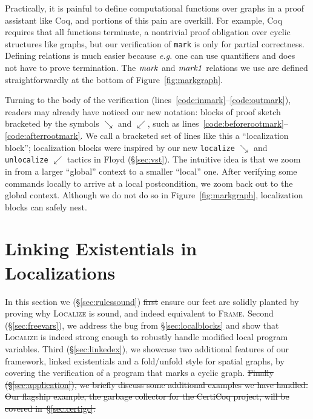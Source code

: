 \documentclass[acmsmall,screen]{acmart}  %
\newcommand{\li}[1]{{\texttt{\small #1}}} %
\providecommand{\DIFadd}[1]{{\protect\color{blue}\uwave{#1}}} %
\providecommand{\DIFdel}[1]{{\protect\color{red}\sout{#1}}}                      %
\providecommand{\DIFaddbegin}{} %
\providecommand{\DIFaddend}{} %
\providecommand{\DIFdelbegin}{} %
\providecommand{\DIFdelend}{} %
\newcommand{\DIFscaledelfig}{0.5}
\newlength{\DIFdelgraphicswidth} %
\newlength{\DIFdelgraphicsheight} %
\newcommand{\DIFaddincludegraphics}[2][]{{\color{blue}\fbox{\DIFOincludegraphics[#1]{#2}}}} %
\newcommand{\DIFdelincludegraphics}[2][]{%
\sbox{\DIFdelgraphicsbox}{\DIFOincludegraphics[#1]{#2}}%
\settoboxwidth{\DIFdelgraphicswidth}{\DIFdelgraphicsbox} %
\settoboxtotalheight{\DIFdelgraphicsheight}{\DIFdelgraphicsbox} %
\scalebox{\DIFscaledelfig}{%
\parbox[b]{\DIFdelgraphicswidth}{\usebox{\DIFdelgraphicsbox}\\[-\baselineskip] \rule{\DIFdelgraphicswidth}{0em}}\llap{\resizebox{\DIFdelgraphicswidth}{\DIFdelgraphicsheight}{%
\setlength{\unitlength}{\DIFdelgraphicswidth}%
\begin{picture}(1,1)%
\thicklines\linethickness{2pt} %
{\color[rgb]{1,0,0}\put(0,0){\framebox(1,1){}}}%
{\color[rgb]{1,0,0}\put(0,0){\line( 1,1){1}}}%
{\color[rgb]{1,0,0}\put(0,1){\line(1,-1){1}}}%
\end{picture}%
}\hspace*{3pt}}} %
} %
\DeclareRobustCommand{\DIFaddbegin}{\DIFOaddbegin \let\includegraphics\DIFaddincludegraphics} %
\DeclareRobustCommand{\DIFaddend}{\DIFOaddend \let\includegraphics\DIFOincludegraphics} %
\DeclareRobustCommand{\DIFdelbegin}{\DIFOdelbegin \let\includegraphics\DIFdelincludegraphics} %
\DeclareRobustCommand{\DIFdelend}{\DIFOaddend \let\includegraphics\DIFOincludegraphics} %
\begin{document}
{Practically, it is painful to define computational functions over graphs in a proof assistant like Coq, and portions of this pain are overkill.  For example, Coq requires that all functions terminate, a nontrivial proof obligation over cyclic structures like graphs, but our verification of \li{mark} is only for partial correctness.  Defining relations is much easier because \emph{e.g.} one can use quantifiers and does not have to prove termination.
The $\mathit{mark}$ and $\mathit{mark1}$ relations we use are defined straightforwardly at the bottom of Figure~\ref{fig:markgraph}.

Turning to the body of the verification (lines~\ref{code:inmark}--\ref{code:outmark}), readers may already have noticed our new notation: blocks of proof sketch bracketed by the symbols $\searrow$ and $\swarrow$, such as lines~\ref{code:beforerootmark}--\ref{code:afterrootmark}.  We call a bracketed set of lines like this a ``localization block''; localization blocks were inspired by our new \li{localize} $\searrow$ and \li{unlocalize} $\swarrow$ tactics in Floyd (\S\ref{sec:vst}).
The intuitive idea is that we zoom in from a larger ``global'' context to a smaller ``local'' one.  After verifying some commands locally to arrive at a local postcondition, we zoom back out to the global context.  Although we do not do so in Figure~\ref{fig:markgraph}, localization blocks can safely nest.
}  
\DIFaddend \section{Linking Existentials in Localizations}
\label{sec:localizations}
In this section we \DIFaddbegin \DIFadd{first }\DIFaddend (\S\ref{sec:rulessound}) \DIFdelbegin \DIFdel{first }\DIFdelend ensure our feet are solidly planted 
by proving why \textsc{Localize} is sound, and indeed equivalent to \textsc{Frame}.  
Second (\S\ref{sec:freevars}), we address the bug from \S\ref{sec:localblocks} 
and show that \textsc{Localize} is indeed strong enough to robustly handle 
modified local program variables.  Third (\S\ref{sec:linkedex}),
we showcase two additional features of our framework, linked existentials 
and a fold/unfold style for spatial graphs, by covering the verification of 
a program that marks a cyclic graph.
\DIFdelbegin \DIFdel{Finally (\S\ref{sec:application}), we briefly discuss some additional examples we have handled.
Our flagship example, the garbage collector for the CertiCoq project, will be covered in~\S\ref{sec:certigc}.
}\DIFdelend 
\end{document}
